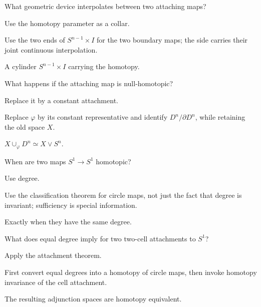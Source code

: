 \begin{exercise}\label{exr:viii08-06}
What geometric device interpolates between two attaching maps?
\end{exercise}
\begin{hint}
Use the homotopy parameter as a collar.

Use the two ends of \(S^{n-1}\times I\) for the two boundary maps; the side carries their joint continuous interpolation.
\end{hint}
\begin{solution}
A cylinder \(S^{n-1}\times I\) carrying the homotopy.
\end{solution}

\begin{exercise}\label{exr:viii08-07}
What happens if the attaching map is null-homotopic?
\end{exercise}
\begin{hint}
Replace it by a constant attachment.

Replace \(\varphi\) by its constant representative and identify \(D^n/\partial D^n\), while retaining the old space \(X\).
\end{hint}
\begin{solution}
\(X\cup_\varphi D^n\simeq X\vee S^n\).
\end{solution}

\begin{exercise}\label{exr:viii08-08}
When are two maps \(S^1\to S^1\) homotopic?
\end{exercise}
\begin{hint}
Use degree.

Use the classification theorem for circle maps, not just the fact that degree is invariant; sufficiency is special information.
\end{hint}
\begin{solution}
Exactly when they have the same degree.
\end{solution}

\begin{exercise}\label{exr:viii08-09}
What does equal degree imply for two two-cell attachments to \(S^1\)?
\end{exercise}
\begin{hint}
Apply the attachment theorem.

First convert equal degrees into a homotopy of circle maps, then invoke homotopy invariance of the cell attachment.
\end{hint}
\begin{solution}
The resulting adjunction spaces are homotopy equivalent.
\end{solution}

